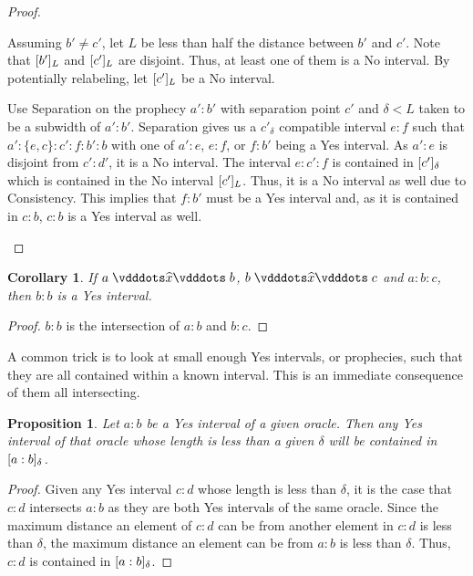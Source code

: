 \documentclass[12pt]{article}
\newtheorem{corollary}{Corollary}[section]
\newtheorem{proposition}{Proposition}[section]
\begin{document}
\begin{proof}
\begin{enumerate}
        Assuming $b' \neq c'$, let $L$ be less than half the distance between $b'$ and $c'$. Note that $\halo[L]{b'}$ and $\halo[L]{c'}$ are disjoint. Thus, at least one of them is a No interval. By potentially relabeling, let $\halo[L]{c'}$ be a No interval. 

        Use Separation on the prophecy $a':b'$ with separation point $c'$ and $\delta < L$ taken to be a subwidth of $a':b'$. Separation gives us a $c'_\delta$ compatible interval $e:f$ such that $a':\{e,c\}:c':f:b':b$  with one of $a':e$, $e:f$, or $f:b'$ being a Yes interval. As $a':e$ is disjoint from $c':d'$, it is a No interval. The interval $e:c':f$ is contained in $\halo{c'}$ which is contained in the No interval $\halo[L]{c'}$. Thus, it is a No interval as well due to Consistency. This implies that $f:b'$ must be a Yes interval and, as it is contained in $c:b$, $c:b$ is a Yes interval as well. 
     \end{enumerate}
\end{proof}

\begin{corollary}
    If $a \xora b$, $b \xora c$ and $a:b:c$, then $b:b$ is a Yes interval.
\end{corollary}

\begin{proof}
    $b:b$ is the intersection of $a:b$ and $b:c$.
\end{proof}

A common trick is to look at small enough Yes intervals, or prophecies, such that they are all contained within a known interval. This is an immediate consequence of them all intersecting. 

\begin{proposition}\label{os:yescontain}
    Let $a:b$ be a Yes interval of a given oracle. Then any Yes interval of that oracle whose length is less than a given $\delta$ will be contained in $\halo{a:b}$.
\end{proposition}

\begin{proof}
    Given any Yes interval $c:d$ whose length is less than $\delta$, it is the case that $c:d$ intersects $a:b$ as they are both Yes intervals of the same oracle. Since the maximum distance an element of $c:d$ can be from another element in $c:d$ is less than $\delta$, the maximum distance an element can be from $a:b$ is less than $\delta$. Thus, $c:d$ is contained in $\halo{a:b}$.
\end{proof}
\end{document}
